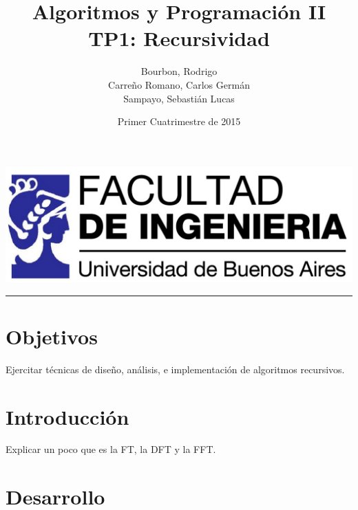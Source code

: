 \documentclass{article}
\begin{document}
\title{Algoritmos y Programación II\\
       TP1: Recursividad}
\author{Bourbon, Rodrigo\\
        Carreño Romano, Carlos Germán\\
        Sampayo, Sebastián Lucas}
\date{Primer Cuatrimestre de 2015}
\maketitle

\begin{center}
  \includegraphics[width=0.5\paperwidth]{Imagenes/logo_fiuba_HD}
  \rule[0.5ex]{0.8\paperwidth}{0.1pt}
\par
\end{center}



\newpage{}
\vfill{}
\tableofcontents{}
\vfill{}
\newpage{}


\section{Objetivos}
  Ejercitar técnicas de diseño, análisis, e implementación de algoritmos recursivos.

\section{Introducción}
  Explicar un poco que es la FT, la DFT y la FFT.

\section{Desarrollo}
\end{document}

